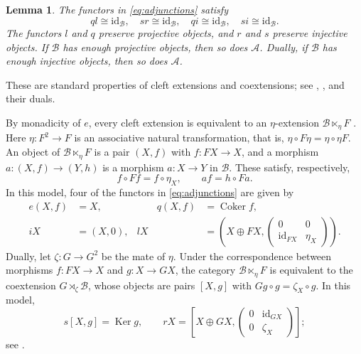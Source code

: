 \documentclass[11pt]{amsart}
\newtheorem{lemma}[theorem]{Lemma}
\theoremstyle{definition}
\theoremstyle{remark}
\theoremstyle{plain}
\numberwithin{equation}{section}
\begin{document}
\begin{lemma}\label{lem:adjoints}
The functors in \eqref{eq:adjunctions} satisfy
\[
 ql \cong \mathrm{id}_{\mathcal{B}}, \quad sr \cong \mathrm{id}_{\mathcal{B}}, \quad
 qi \cong \mathrm{id}_{\mathcal{B}}, \quad si \cong \mathrm{id}_{\mathcal{B}}.
\]
The functors $l$ and $q$ preserve projective objects, and $r$ and $s$
preserve injective objects. If $\mathcal{B}$ has enough projective objects, then
so does $\mathcal{A}$. Dually, if $\mathcal{B}$ has enough injective objects, then so does
$\mathcal{A}$.
\end{lemma}

These are standard properties of cleft extensions and coextensions;
see \cite[Propositions~2.3 and~5.4(1)]{BelCleft},
\cite[Section~2]{Kostas}, and their duals.

By monadicity of $e$, every cleft extension is equivalent to an
$\eta$-extension $\mathcal{B} \ltimes_\eta F$ \cite{BelCleft,Marmaridis}. Here
$\eta: F^2 \to F$ is an associative natural transformation, that is,
$\eta \circ F\eta = \eta \circ \eta F$. An object of $\mathcal{B} \ltimes_\eta F$ is a
pair $(X, f)$ with $f: FX \to X$, and a morphism
$a: (X, f) \to (Y, h)$ is a morphism $a: X \to Y$ in $\mathcal{B}$. These satisfy,
respectively,
\[
 f \circ Ff = f \circ \eta_X, \qquad af = h \circ Fa.
\]
In this model, four of the functors in \eqref{eq:adjunctions} are given by
\begin{equation}\label{eq:model}
 \begin{alignedat}{2}
 e(X, f) & = X, & \qquad q(X, f) & = \operatorname{Coker} f, \\[2pt]
 iX & = (X, 0), & lX & = \left(X \oplus FX,
       \begin{pmatrix}0 & 0\\ \mathrm{id}_{FX} & \eta_X\end{pmatrix}\right).
 \end{alignedat}
\end{equation}
Dually, let $\zeta: G \to G^2$ be the mate of $\eta$. Under the
correspondence between morphisms $f: FX \to X$ and $g: X \to GX$, the category
$\mathcal{B} \ltimes_\eta F$ is equivalent to the coextension $G \rtimes_\zeta\mathcal{B}$,
whose objects are pairs $[X, g]$ with $Gg \circ g = \zeta_X \circ g$. In this
model,
\[
 s[X, g] = \operatorname{Ker} g, \qquad
 rX = \left[X \oplus GX,
       \begin{pmatrix}0 & \mathrm{id}_{GX}\\0 & \zeta_X\end{pmatrix}\right];
\]
see \cite[Sections~2.2 and~2.4]{BelRelative}.
\end{document}
